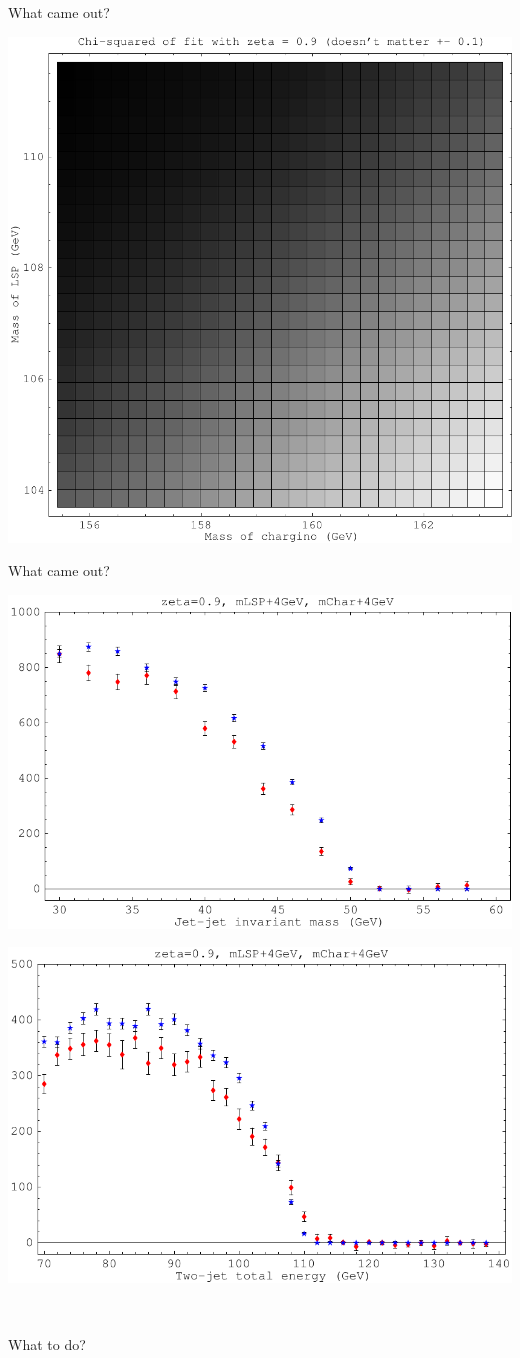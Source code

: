 \documentclass[landscape]{article}
\begin{document}
What came out?

\vfill

\includegraphics[width=0.7\linewidth]{fakeit_chisquare.pdf}

\pagebreak

What came out?

\vfill

\includegraphics[width=0.5\linewidth]{fakeit_plus4mass.pdf}

\vfill

\includegraphics[width=0.5\linewidth]{fakeit_plus4energy.pdf}

\pagebreak

\mbox{ }

\vfill

What to do?
\end{document}
